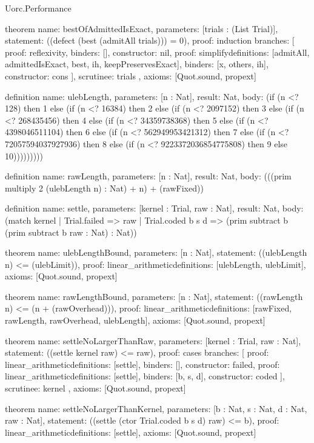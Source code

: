 \begin{lexlean}{Uorc.Performance}
\begin{semanticmodule}
theorem{
  name: bestOfAdmittedIsExact,
  parameters: [trials : (List Trial)],
  statement: ((defect (best (admitAll trials))) = 0),
  proof: induction{
    branches: [
      {proof: reflexivity{}, binders: [], constructor: nil},
      {
        proof: simplify{definitions: [admitAll, admittedIsExact, best, ih, keepPreservesExact]},
        binders: [x, others, ih],
        constructor: cons
      }
    ],
    scrutinee: trials
  },
  axioms: [Quot.sound, propext]
}

definition{
  name: ulebLength,
  parameters: [n : Nat],
  result: Nat,
  body: (if (n <? 128) then 1 else (if (n <? 16384) then 2 else (if (n <? 2097152) then 3 else (if (n <? 268435456) then 4 else (if (n <? 34359738368) then 5 else (if (n <? 4398046511104) then 6 else (if (n <? 562949953421312) then 7 else (if (n <? 72057594037927936) then 8 else (if (n <? 9223372036854775808) then 9 else 10)))))))))
}

definition{
  name: rawLength,
  parameters: [n : Nat],
  result: Nat,
  body: (((prim multiply 2 (ulebLength n) : Nat) + n) + (rawFixed))
}

definition{
  name: settle,
  parameters: [kernel : Trial, raw : Nat],
  result: Nat,
  body: (match kernel
    | Trial.failed => raw
    | Trial.coded b s d => (prim subtract b (prim subtract b raw : Nat) : Nat))
}

theorem{
  name: ulebLengthBound,
  parameters: [n : Nat],
  statement: ((ulebLength n) <= (ulebLimit)),
  proof: linear_arithmetic{definitions: [ulebLength, ulebLimit]},
  axioms: [Quot.sound, propext]
}

theorem{
  name: rawLengthBound,
  parameters: [n : Nat],
  statement: ((rawLength n) <= (n + (rawOverhead))),
  proof: linear_arithmetic{definitions: [rawFixed, rawLength, rawOverhead, ulebLength]},
  axioms: [Quot.sound, propext]
}

theorem{
  name: settleNoLargerThanRaw,
  parameters: [kernel : Trial, raw : Nat],
  statement: ((settle kernel raw) <= raw),
  proof: cases{
    branches: [
      {proof: linear_arithmetic{definitions: [settle]}, binders: [], constructor: failed},
      {proof: linear_arithmetic{definitions: [settle]}, binders: [b, s, d], constructor: coded}
    ],
    scrutinee: kernel
  },
  axioms: [Quot.sound, propext]
}

theorem{
  name: settleNoLargerThanKernel,
  parameters: [b : Nat, s : Nat, d : Nat, raw : Nat],
  statement: ((settle (ctor Trial.coded b s d) raw) <= b),
  proof: linear_arithmetic{definitions: [settle]},
  axioms: [Quot.sound, propext]
}


\end{semanticmodule}
\end{lexlean}
